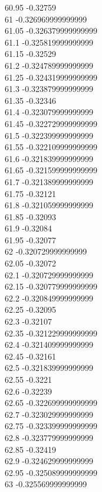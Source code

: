 {60.95	-0.32759\\
61	-0.326969999999999\\
61.05	-0.326379999999999\\
61.1	-0.325819999999999\\
61.15	-0.32529\\
61.2	-0.324789999999999\\
61.25	-0.324319999999999\\
61.3	-0.323879999999999\\
61.35	-0.32346\\
61.4	-0.323079999999999\\
61.45	-0.322729999999999\\
61.5	-0.322399999999999\\
61.55	-0.322109999999999\\
61.6	-0.321839999999999\\
61.65	-0.321599999999999\\
61.7	-0.321389999999999\\
61.75	-0.32121\\
61.8	-0.321059999999999\\
61.85	-0.32093\\
61.9	-0.32084\\
61.95	-0.32077\\
62	-0.320729999999999\\
62.05	-0.32072\\
62.1	-0.320729999999999\\
62.15	-0.320779999999999\\
62.2	-0.320849999999999\\
62.25	-0.32095\\
62.3	-0.32107\\
62.35	-0.321229999999999\\
62.4	-0.321409999999999\\
62.45	-0.32161\\
62.5	-0.321839999999999\\
62.55	-0.3221\\
62.6	-0.32239\\
62.65	-0.322699999999999\\
62.7	-0.323029999999999\\
62.75	-0.323399999999999\\
62.8	-0.323779999999999\\
62.85	-0.32419\\
62.9	-0.324629999999999\\
62.95	-0.325089999999999\\
63	-0.325569999999999\\
}
